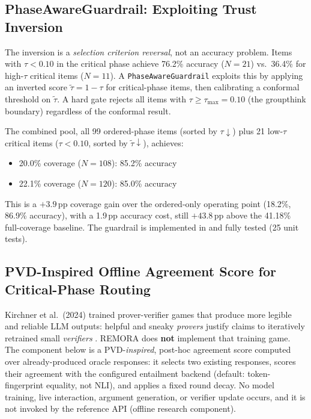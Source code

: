 \documentclass[10pt,twocolumn]{article}
\begin{document}
\subsection{PhaseAwareGuardrail: Exploiting Trust Inversion}
\label{sec:phase_aware}

The inversion is a \emph{selection criterion reversal}, not an
accuracy problem.  Items with $\tau < 0.10$ in the critical phase
achieve 76.2\% accuracy ($N=21$) vs.\ 36.4\% for high-$\tau$
critical items ($N=11$).  A \texttt{PhaseAwareGuardrail} exploits
this by applying an inverted score $\tilde{\tau} = 1 - \tau$ for
critical-phase items, then calibrating a conformal threshold on
$\tilde{\tau}$.  A hard gate rejects all items with $\tau \geq
\tau_{\max} = 0.10$ (the groupthink boundary) regardless of the
conformal result.

The combined pool, all 99 ordered-phase items (sorted by
$\tau \downarrow$) plus 21 low-$\tau$ critical items ($\tau < 0.10$,
sorted by $\tilde{\tau} \downarrow$), achieves:

\begin{itemize}[leftmargin=*]
  \item 20.0\% coverage ($N=108$): 85.2\% accuracy 
  \item 22.1\% coverage ($N=120$): 85.0\% accuracy 
\end{itemize}

This is a $+3.9$\,pp coverage gain over the ordered-only operating
point (18.2\%, 86.9\% accuracy), with a 1.9\,pp accuracy cost, still
$+43.8$\,pp above the 41.18\% full-coverage baseline.  The guardrail is
implemented in 
and fully tested (25 unit tests).

\subsection{PVD-Inspired Offline Agreement Score for Critical-Phase Routing}
\label{sec:pvd}

Kirchner et al.\ (2024) trained prover-verifier games that produce more
legible and reliable LLM outputs: helpful and sneaky \emph{provers}
justify claims to iteratively retrained small \emph{verifiers}
\cite{kirsch2024prover}. REMORA does \textbf{not} implement that training
game. The component below is a PVD-\emph{inspired}, post-hoc agreement
score computed over already-produced oracle responses: it selects two
existing responses, scores their agreement with the configured entailment
backend (default: token-fingerprint equality, not NLI), and applies a
fixed round decay. No model training, live interaction, argument
generation, or verifier update occurs, and it is not invoked by the
reference API (offline research component).
\end{document}
